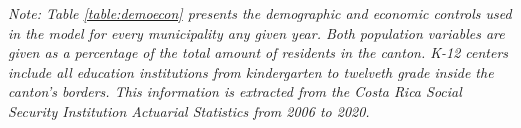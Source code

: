 \begin{table}[ht]
\caption{Demographic and Economic Variables per Municipality ($\mathbf{Mun'_{it}}$)}
\begin{center}
    

\label{table:demoecon}
\end{center}
\footnotesize
\textit{Note: Table \ref{table:demoecon} presents the demographic and economic controls used in the model for every municipality any given year. Both population variables are given as a percentage of the total amount of residents in the canton. K-12 centers include all education institutions from kindergarten to twelveth grade inside the canton's borders. This information is extracted from the Costa Rica Social Security Institution Actuarial Statistics from 2006 to 2020.}
\end{table}